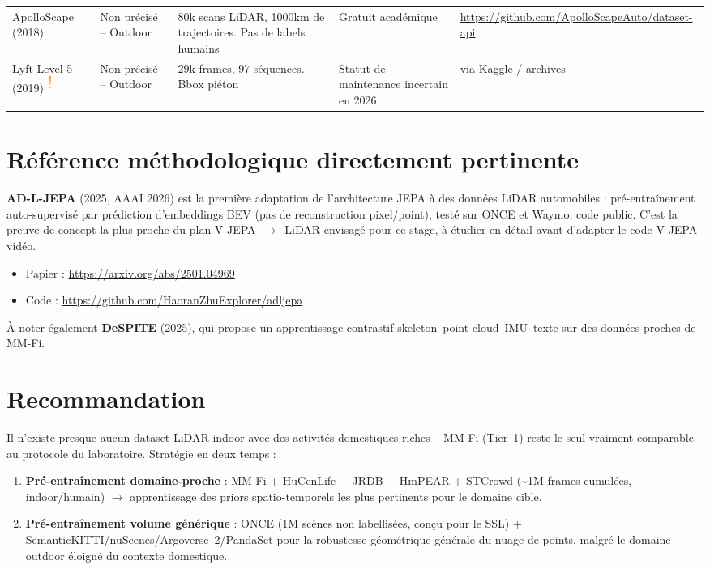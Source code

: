 \documentclass[11pt]{article}
\begin{document}
\begin{longtable}{P{2.6cm} P{3.0cm} P{4.2cm} P{2.4cm} P{3.0cm}}
ApolloScape (2018) &
Non précisé -- Outdoor &
80k scans LiDAR, 1000km de trajectoires. Pas de labels humains &
Gratuit académique &
\url{https://github.com/ApolloScapeAuto/dataset-api} \\
\addlinespace

Lyft Level 5 (2019) $^{\text{\Large\textcolor{orange}{!}}}$ &
Non précisé -- Outdoor &
29k frames, 97 séquences. Bbox piéton &
Statut de maintenance incertain en 2026 &
via Kaggle / archives \\

\bottomrule
\end{longtable}

\normalsize

\section{Référence méthodologique directement pertinente}

\textbf{AD-L-JEPA} (2025, AAAI 2026) est la première adaptation de l'architecture JEPA à des
données LiDAR automobiles : pré-entraînement auto-supervisé par prédiction d'embeddings BEV
(pas de reconstruction pixel/point), testé sur ONCE et Waymo, code public. C'est la preuve de
concept la plus proche du plan V-JEPA~$\rightarrow$~LiDAR envisagé pour ce stage, à étudier en
détail avant d'adapter le code V-JEPA vidéo.
\begin{itemize}
    \item Papier : \url{https://arxiv.org/abs/2501.04969}
    \item Code : \url{https://github.com/HaoranZhuExplorer/adljepa}
\end{itemize}

À noter également \textbf{DeSPITE} (2025), qui propose un apprentissage contrastif
skeleton--point cloud--IMU--texte sur des données proches de MM-Fi.

\section{Recommandation}

Il n'existe presque aucun dataset LiDAR indoor avec des activités domestiques riches --
MM-Fi (Tier~1) reste le seul vraiment comparable au protocole du laboratoire. Stratégie en
deux temps :

\begin{enumerate}
    \item \textbf{Pré-entraînement domaine-proche} : MM-Fi + HuCenLife + JRDB + HmPEAR +
    STCrowd (\textasciitilde{}1M frames cumulées, indoor/humain) $\rightarrow$ apprentissage
    des priors spatio-temporels les plus pertinents pour le domaine cible.
    \item \textbf{Pré-entraînement volume générique} : ONCE (1M scènes non labellisées,
    conçu pour le SSL) + SemanticKITTI/nuScenes/Argoverse~2/PandaSet pour la robustesse
    géométrique générale du nuage de points, malgré le domaine outdoor éloigné du contexte
    domestique.
\end{enumerate}
\end{document}

